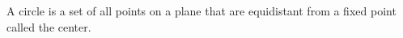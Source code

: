 \documentclass[preview]{standalone}
\begin{document}
\begin{center}
A circle is a set of all points on a plane that are equidistant from a fixed point called the center.
\end{center}
\end{document}
